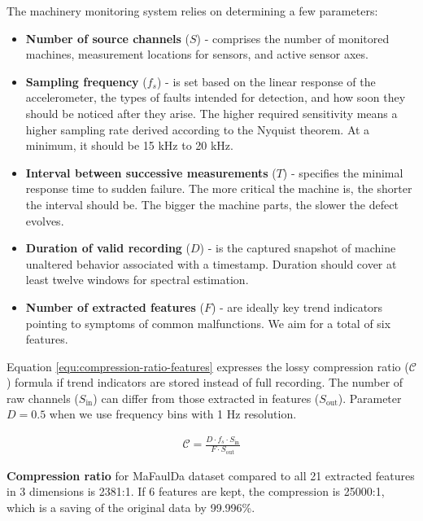 The machinery monitoring system relies on determining a few parameters:
\begin{itemize}
\itemsep0pt
\item \textbf{Number of source channels} ($S$) - comprises the number of monitored machines, measurement locations for sensors, and active sensor axes.
\item \textbf{Sampling frequency} ($f_s$) - is set based on the linear response of the accelerometer, the types of faults intended for detection, and how soon they should be noticed after they arise. The higher required sensitivity means a higher sampling rate derived according to the Nyquist theorem. At a minimum, it should be 15 kHz to 20 kHz.
\item \textbf{Interval between successive measurements} ($T$) - specifies the minimal response time to sudden failure. The more critical the machine is, the shorter the interval should be. The bigger the machine parts, the slower the defect evolves.
\item \textbf{Duration of valid recording} ($D$) - is the captured snapshot of machine unaltered behavior associated with a timestamp. Duration should cover at least twelve windows for spectral estimation.
\item \textbf{Number of extracted features} ($F$) - are ideally key trend indicators pointing to symptoms of common malfunctions. We aim for a total of six features.
\end{itemize}

Equation \ref{equ:compression-ratio-features} expresses the lossy compression ratio ($\mathcal{C}$) formula if trend indicators are stored instead of full recording. The number of raw channels ($S_{\mathrm{in}}$) can differ from those extracted in features ($S_{\mathrm{out}}$). Parameter $D = 0.5$ when we use frequency bins with 1 Hz resolution.

\begin{ceqn}\begin{align} \label{equ:compression-ratio-features}
\mathcal{C} = \frac{D \cdot f_s \cdot S_{\mathrm{in}}}{F \cdot S_{\mathrm{out}}}
\end{align}\end{ceqn}

\textbf{Compression ratio} for MaFaulDa dataset compared to all 21 extracted features in 3 dimensions is 2381:1. If 6 features are kept, the compression is 25000:1, which is a saving of the original data by 99.996\%.


